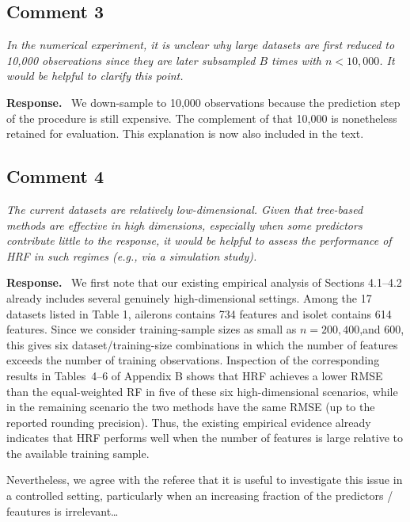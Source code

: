 \documentclass[12pt]{article}
\newcommand{\comment}[1]{\begin{refbox}\itshape #1\end{refbox}}
\newcommand{\response}{\medskip\noindent\textbf{Response.}\ }
\begin{document}
\subsection*{Comment 3}

\comment{In the numerical experiment, it is unclear why large datasets are
first reduced to 10,000 observations since they are later subsampled $B$
times with $n < 10{,}000$. It would be helpful to clarify this point.}

\response
We down-sample to 10,000 observations because the prediction step of the procedure is still expensive.  The complement of that 10,000 is nonetheless retained for evaluation.  This explanation is now also included in the text.

\subsection*{Comment 4}

\comment{The current datasets are relatively low-dimensional. Given that
tree-based methods are effective in high dimensions, especially when some
predictors contribute little to the response, it would be helpful to assess
the performance of HRF in such regimes (e.g., via a simulation study).}

\response
We first note that our existing empirical analysis of Sections 4.1--4.2
already includes several genuinely high-dimensional settings. Among the 17 datasets listed in Table 1, ailerons contains 734 features and isolet contains 614 features. Since we consider training-sample sizes as small as $n=200,400$,and $600$, this gives six dataset/training-size combinations in which the number of features exceeds the number of training observations. Inspection of the corresponding results in Tables~4--6 of Appendix B shows that HRF achieves a lower RMSE than the equal-weighted RF in five of these six high-dimensional scenarios, while in the remaining scenario the two methods have the same RMSE (up to the reported rounding precision). Thus, the existing empirical evidence already indicates that HRF performs well when the number of features is large relative to the available training sample.

Nevertheless, we agree with the referee that it is useful to investigate this issue in a controlled setting, particularly when an increasing fraction of the predictors / feautures is irrelevant…
\end{document}
